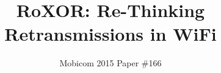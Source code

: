 \documentclass{sig-alternate}
\begin{document}
\newcommand{\roxor}{RoXOR}
\title{\roxor: Re-Thinking Retransmissions in WiFi}
\author{Mobicom 2015 Paper \#166}
\maketitle









{
\small
{}
}
%
\end{document}
